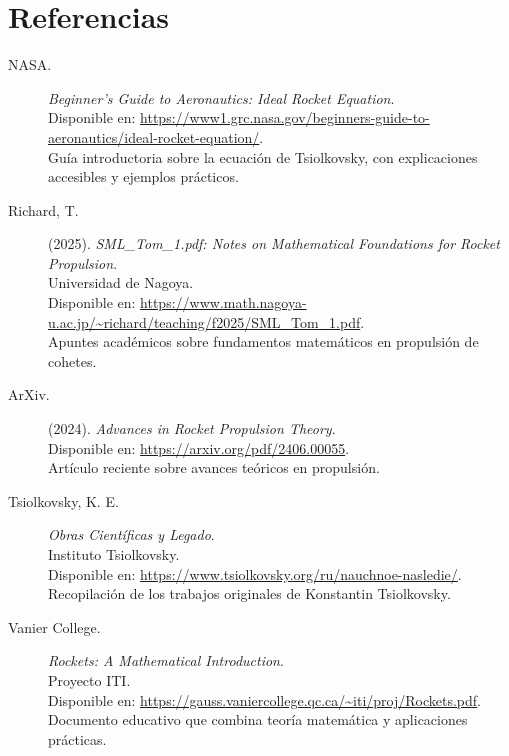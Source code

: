 \documentclass{article}
\begin{document}
\section*{Referencias}
\begin{description}
    \item[NASA.] \textit{Beginner’s Guide to Aeronautics: Ideal Rocket Equation}. \\
    Disponible en: \url{https://www1.grc.nasa.gov/beginners-guide-to-aeronautics/ideal-rocket-equation/}. \\
    Guía introductoria sobre la ecuación de Tsiolkovsky, con explicaciones accesibles y ejemplos prácticos.

    \item[Richard, T.] (2025). \textit{SML\_Tom\_1.pdf: Notes on Mathematical Foundations for Rocket Propulsion}. \\
    Universidad de Nagoya. \\
    Disponible en: \url{https://www.math.nagoya-u.ac.jp/~richard/teaching/f2025/SML_Tom_1.pdf}. \\
    Apuntes académicos sobre fundamentos matemáticos en propulsión de cohetes.

    \item[ArXiv.] (2024). \textit{Advances in Rocket Propulsion Theory}. \\
    Disponible en: \url{https://arxiv.org/pdf/2406.00055}. \\
    Artículo reciente sobre avances teóricos en propulsión.

    \item[Tsiolkovsky, K. E.] \textit{Obras Científicas y Legado}. \\
    Instituto Tsiolkovsky. \\
    Disponible en: \url{https://www.tsiolkovsky.org/ru/nauchnoe-nasledie/}. \\
    Recopilación de los trabajos originales de Konstantin Tsiolkovsky.

    \item[Vanier College.] \textit{Rockets: A Mathematical Introduction}. \\
    Proyecto ITI. \\
    Disponible en: \url{https://gauss.vaniercollege.qc.ca/~iti/proj/Rockets.pdf}. \\
    Documento educativo que combina teoría matemática y aplicaciones prácticas.
\end{description}





\end{document}
